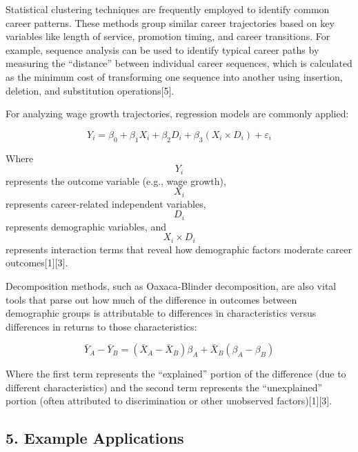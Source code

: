 \documentclass[
  letterpaper,
  DIV=11,
  numbers=noendperiod]{scrartcl}
\begin{document}
Statistical clustering techniques are frequently employed to identify
common career patterns. These methods group similar career trajectories
based on key variables like length of service, promotion timing, and
career transitions. For example, sequence analysis can be used to
identify typical career paths by measuring the ``distance'' between
individual career sequences, which is calculated as the minimum cost of
transforming one sequence into another using insertion, deletion, and
substitution operations{[}5{]}.

For analyzing wage growth trajectories, regression models are commonly
applied:

\[ Y_i = \beta_0 + \beta_1 X_i + \beta_2 D_i + \beta_3 (X_i \times D_i) + \varepsilon_i \]

Where \[Y_i\] represents the outcome variable (e.g., wage growth),
\[X_i\] represents career-related independent variables, \[D_i\]
represents demographic variables, and \[X_i \times D_i\] represents
interaction terms that reveal how demographic factors moderate career
outcomes{[}1{]}{[}3{]}.

Decomposition methods, such as Oaxaca-Blinder decomposition, are also
vital tools that parse out how much of the difference in outcomes
between demographic groups is attributable to differences in
characteristics versus differences in returns to those characteristics:

\[ \bar{Y}_A - \bar{Y}_B = (\bar{X}_A - \bar{X}_B)\beta_A + \bar{X}_B(\beta_A - \beta_B) \]

Where the first term represents the ``explained'' portion of the
difference (due to different characteristics) and the second term
represents the ``unexplained'' portion (often attributed to
discrimination or other unobserved factors){[}1{]}{[}3{]}.

\subsection{5. Example Applications}\label{example-applications}
\end{document}

